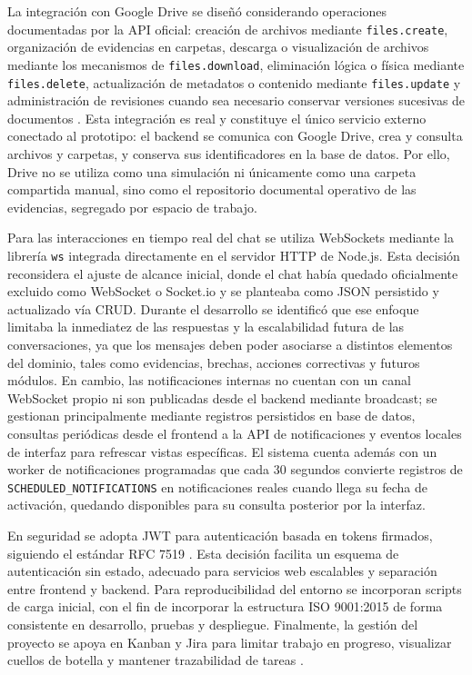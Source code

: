 \documentclass[final]{udpthesis}
\begin{document}
La integración con Google Drive se diseñó considerando operaciones documentadas por la API oficial: creación de archivos mediante \texttt{files.create}, organización de evidencias en carpetas, descarga o visualización de archivos mediante los mecanismos de \texttt{files.download}, eliminación lógica o física mediante \texttt{files.delete}, actualización de metadatos o contenido mediante \texttt{files.update} y administración de revisiones cuando sea necesario conservar versiones sucesivas de documentos \cite{google-drive-create,google-drive-folders,google-drive-download,google-drive-delete,google-drive-update,google-drive-revisions}. Esta integración es real y constituye el único servicio externo conectado al prototipo: el backend se comunica con Google Drive, crea y consulta archivos y carpetas, y conserva sus identificadores en la base de datos. Por ello, Drive no se utiliza como una simulación ni únicamente como una carpeta compartida manual, sino como el repositorio documental operativo de las evidencias, segregado por espacio de trabajo.

Para las interacciones en tiempo real del chat se utiliza WebSockets mediante la librería \texttt{ws} integrada directamente en el servidor HTTP de Node.js. Esta decisión reconsidera el ajuste de alcance inicial, donde el chat había quedado oficialmente excluido como WebSocket o Socket.io y se planteaba como JSON persistido y actualizado vía CRUD. Durante el desarrollo se identificó que ese enfoque limitaba la inmediatez de las respuestas y la escalabilidad futura de las conversaciones, ya que los mensajes deben poder asociarse a distintos elementos del dominio, tales como evidencias, brechas, acciones correctivas y futuros módulos. En cambio, las notificaciones internas no cuentan con un canal WebSocket propio ni son publicadas desde el backend mediante broadcast; se gestionan principalmente mediante registros persistidos en base de datos, consultas periódicas desde el frontend a la API de notificaciones y eventos locales de interfaz para refrescar vistas específicas. El sistema cuenta además con un worker de notificaciones programadas que cada 30 segundos convierte registros de \texttt{SCHEDULED\_NOTIFICATIONS} en notificaciones reales cuando llega su fecha de activación, quedando disponibles para su consulta posterior por la interfaz.

En seguridad se adopta JWT para autenticación basada en tokens firmados, siguiendo el estándar RFC 7519 \cite{rfc7519}. Esta decisión facilita un esquema de autenticación sin estado, adecuado para servicios web escalables y separación entre frontend y backend. Para reproducibilidad del entorno se incorporan scripts de carga inicial, con el fin de incorporar la estructura ISO 9001:2015 de forma consistente en desarrollo, pruebas y despliegue. Finalmente, la gestión del proyecto se apoya en Kanban y Jira para limitar trabajo en progreso, visualizar cuellos de botella y mantener trazabilidad de tareas \cite{atlassian-kanban}.
\end{document}
